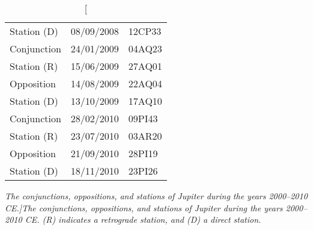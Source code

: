 \begin{table}
{\begin{tabular}{lcl}
Station (D) & 08/09/2008 & 12CP33\\
Conjunction & 24/01/2009 & 04AQ23\\
Station (R) & 15/06/2009 & 27AQ01\\
Opposition & 14/08/2009 & 22AQ04\\
Station (D) & 13/10/2009 & 17AQ10\\
Conjunction & 28/02/2010 & 09PI43\\
Station (R) & 23/07/2010 & 03AR20\\
Opposition & 21/09/2010 & 28PI19\\
Station (D) & 18/11/2010 & 23PI26\\
\end{tabular}}
\caption[\em The conjunctions, oppositions, and stations of Jupiter
during the years 2000--2010 CE.]{\em The conjunctions, oppositions, and stations of Jupiter
during the years 2000--2010 CE. (R) indicates a retrograde station, and (D)
a direct station.}\label{vtjupiter}
\end{table}

